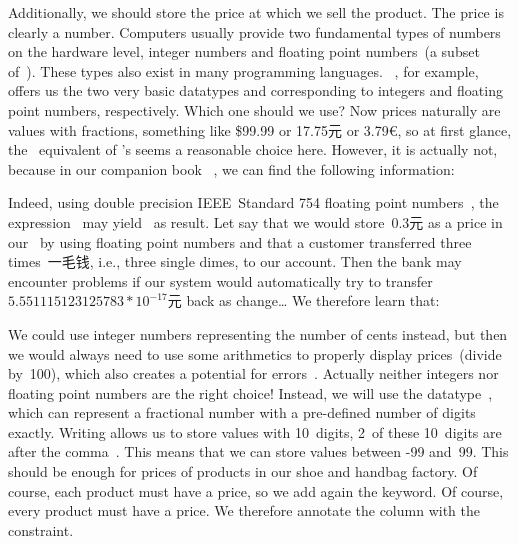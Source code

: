 Additionally, we should store the price at which we sell the product.
The price is clearly a number.
Computers usually provide two fundamental types of numbers on the hardware level, integer numbers and floating point numbers~(a subset of~\realNumbers).
These types also exist in many programming languages.
\python~\cite{programmingWithPython}, for example, offers us the two very basic datatypes  and  corresponding to integers and floating point numbers, respectively.
Which one should we use?
Now prices naturally are values with fractions, something like \$99.99 or 17.75元 or 3.79€, so at first glance, the \sql\ equivalent of \python's  seems a reasonable choice here.
However, it is actually not, because in our companion book ~\cite{programmingWithPython}, we can find the following information:%
%
%
%
\begin{sloppypar}%
Indeed, using double precision IEEE~Standard 754 floating point numbers~\cite{IEEE2019ISFFPA,H1997IS7FPN}, the expression~ may yield~ as result.
Let say that we would store~0.3元 as a price in our \db\ by using floating point numbers and that a customer transferred three times~一毛钱, i.e., three single dimes, to our account.
Then the bank may encounter problems if our system would automatically try to transfer $5.551115123125783*10^{-17}$元 back as change\dots
We therefore learn that:%
\end{sloppypar}%
%
%
%
We could use integer numbers representing the number of cents instead, but then we would always need to use some arithmetics to properly display prices~(divide by~100), which also creates a potential for errors~\cite{W2020HSISCVISS}.
Actually neither integers nor floating point numbers are the right choice!
Instead, we will use the datatype~, which can represent a fractional number with a pre-defined number of digits exactly.
Writing  allows us to store values with 10~digits, 2~of these 10~digits are after the comma~\cite{PGDG:PD:NT}.
This means that we can store values between -99 and~99.
This should be enough for prices of products in our shoe and handbag factory.
Of course, each product must have a price, so we add again the  keyword.%
%
%
%
Of course, every product must have a price.
We therefore annotate the column  with the  constraint.

